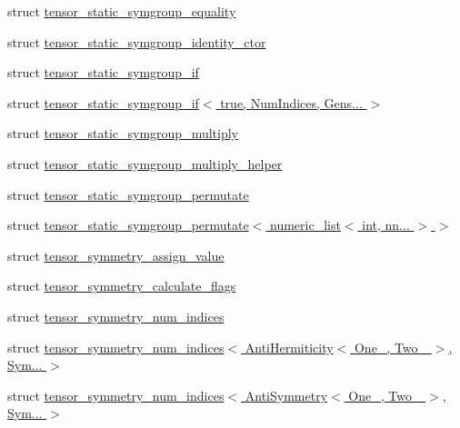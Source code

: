 \begin{DoxyCompactItemize}
\item 
struct \hyperlink{struct_eigen_1_1internal_1_1tensor__static__symgroup__equality}{tensor\+\_\+static\+\_\+symgroup\+\_\+equality}
\item 
struct \hyperlink{struct_eigen_1_1internal_1_1tensor__static__symgroup__identity__ctor}{tensor\+\_\+static\+\_\+symgroup\+\_\+identity\+\_\+ctor}
\item 
struct \hyperlink{struct_eigen_1_1internal_1_1tensor__static__symgroup__if}{tensor\+\_\+static\+\_\+symgroup\+\_\+if}
\item 
struct \hyperlink{struct_eigen_1_1internal_1_1tensor__static__symgroup__if_3_01true_00_01_num_indices_00_01_gens_8_8_8_01_4}{tensor\+\_\+static\+\_\+symgroup\+\_\+if$<$ true, Num\+Indices, Gens... $>$}
\item 
struct \hyperlink{struct_eigen_1_1internal_1_1tensor__static__symgroup__multiply}{tensor\+\_\+static\+\_\+symgroup\+\_\+multiply}
\item 
struct \hyperlink{struct_eigen_1_1internal_1_1tensor__static__symgroup__multiply__helper}{tensor\+\_\+static\+\_\+symgroup\+\_\+multiply\+\_\+helper}
\item 
struct \hyperlink{struct_eigen_1_1internal_1_1tensor__static__symgroup__permutate}{tensor\+\_\+static\+\_\+symgroup\+\_\+permutate}
\item 
struct \hyperlink{struct_eigen_1_1internal_1_1tensor__static__symgroup__permutate_3_01numeric__list_3_01int_00_01nn_8_8_8_01_4_01_4}{tensor\+\_\+static\+\_\+symgroup\+\_\+permutate$<$ numeric\+\_\+list$<$ int, nn... $>$ $>$}
\item 
struct \hyperlink{struct_eigen_1_1internal_1_1tensor__symmetry__assign__value}{tensor\+\_\+symmetry\+\_\+assign\+\_\+value}
\item 
struct \hyperlink{struct_eigen_1_1internal_1_1tensor__symmetry__calculate__flags}{tensor\+\_\+symmetry\+\_\+calculate\+\_\+flags}
\item 
struct \hyperlink{struct_eigen_1_1internal_1_1tensor__symmetry__num__indices}{tensor\+\_\+symmetry\+\_\+num\+\_\+indices}
\item 
struct \hyperlink{struct_eigen_1_1internal_1_1tensor__symmetry__num__indices_3_01_anti_hermiticity_3_01_one___00_00182a5a3b195af54d2fe6bb829d4e663}{tensor\+\_\+symmetry\+\_\+num\+\_\+indices$<$ Anti\+Hermiticity$<$ One\+\_\+, Two\+\_\+ $>$, Sym... $>$}
\item 
struct \hyperlink{struct_eigen_1_1internal_1_1tensor__symmetry__num__indices_3_01_anti_symmetry_3_01_one___00_01_two___01_4_00_01_sym_8_8_8_01_4}{tensor\+\_\+symmetry\+\_\+num\+\_\+indices$<$ Anti\+Symmetry$<$ One\+\_\+, Two\+\_\+ $>$, Sym... $>$}

\end{DoxyCompactItemize}
